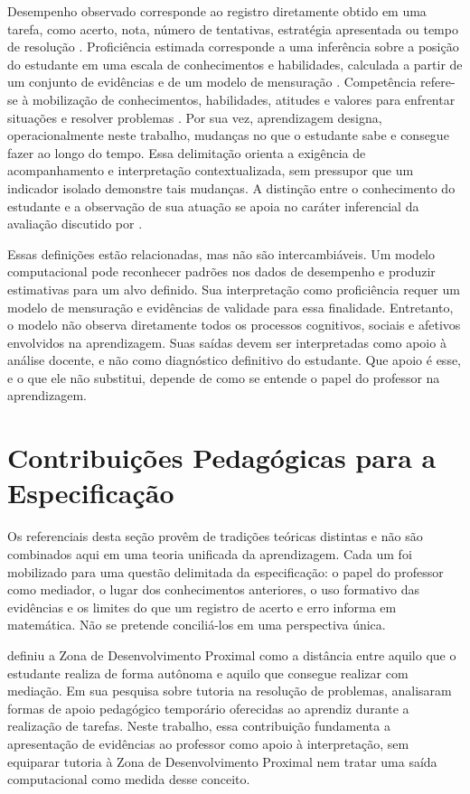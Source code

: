 Desempenho observado corresponde ao registro diretamente obtido em uma tarefa, como acerto, nota, número de tentativas, estratégia apresentada ou tempo de resolução \cite{NRC2001}. Proficiência estimada corresponde a uma inferência sobre a posição do estudante em uma escala de conhecimentos e habilidades, calculada a partir de um conjunto de evidências e de um modelo de mensuração \cite{NRC2001, OECDPISA2022Framework}. Competência refere-se à mobilização de conhecimentos, habilidades, atitudes e valores para enfrentar situações e resolver problemas \cite{BNCC2018}. Por sua vez, aprendizagem designa, operacionalmente neste trabalho, mudanças no que o estudante sabe e consegue fazer ao longo do tempo. Essa delimitação orienta a exigência de acompanhamento e interpretação contextualizada, sem pressupor que um indicador isolado demonstre tais mudanças. A distinção entre o conhecimento do estudante e a observação de sua atuação se apoia no caráter inferencial da avaliação discutido por .

Essas definições estão relacionadas, mas não são intercambiáveis. Um modelo computacional pode reconhecer padrões nos dados de desempenho e produzir estimativas para um alvo definido. Sua interpretação como proficiência requer um modelo de mensuração e evidências de validade para essa finalidade. Entretanto, o modelo não observa diretamente todos os processos cognitivos, sociais e afetivos envolvidos na aprendizagem. Suas saídas devem ser interpretadas como apoio à análise docente, e não como diagnóstico definitivo do estudante. Que apoio é esse, e o que ele não substitui, depende de como se entende o papel do professor na aprendizagem.

\section{Contribuições Pedagógicas para a Especificação}
\label{sec:fund-pedagogicas}

Os referenciais desta seção provêm de tradições teóricas distintas e não são combinados aqui em uma teoria unificada da aprendizagem. Cada um foi mobilizado para uma questão delimitada da especificação: o papel do professor como mediador, o lugar dos conhecimentos anteriores, o uso formativo das evidências e os limites do que um registro de acerto e erro informa em matemática. Não se pretende conciliá-los em uma perspectiva única.

 definiu a Zona de Desenvolvimento Proximal como a distância entre aquilo que o estudante realiza de forma autônoma e aquilo que consegue realizar com mediação. Em sua pesquisa sobre tutoria na resolução de problemas,  analisaram formas de apoio pedagógico temporário oferecidas ao aprendiz durante a realização de tarefas. Neste trabalho, essa contribuição fundamenta a apresentação de evidências ao professor como apoio à interpretação, sem equiparar tutoria à Zona de Desenvolvimento Proximal nem tratar uma saída computacional como medida desse conceito.

